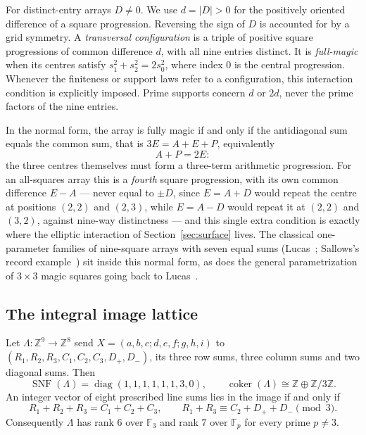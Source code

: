 For distinct-entry arrays $D\ne0$. We use $d=|D|>0$ for the positively
oriented difference of a square progression. Reversing the sign of $D$
is accounted for by a grid symmetry. A \emph{transversal configuration}
is a triple of positive square progressions of common difference $d$,
with all nine entries distinct. It is \emph{full-magic} when its centres
satisfy $s_1^2+s_2^2=2s_0^2$, where index $0$ is the central progression.
Whenever the finiteness or support laws refer to a configuration, this
interaction condition is explicitly imposed. Prime supports concern
$d$ or $2d$, never the prime factors of the nine entries.


\begin{remark}\label{rem:fourthAP}
In the normal form, the array is fully magic if and only if the
antidiagonal sum equals the common sum, that is $3E=A+E+P$, equivalently
\[
A+P=2E:
\]
the three centres themselves must form a three-term arithmetic progression.
For an all-squares array this is a \emph{fourth} square progression, with
its own common difference $E-A$ --- never equal to $\pm D$, since $E=A+D$
would repeat the centre at positions $(2,2)$ and $(2,3)$, while $E=A-D$
would repeat it at $(2,2)$ and $(3,2)$, against nine-way distinctness ---
and this single extra condition is exactly
where the elliptic interaction of Section~\ref{sec:surface} lives. The classical
one-parameter families of nine-square arrays with seven equal sums
(Lucas~\cite{LUC76}; Sallows's record example~\cite{SAL97}) sit inside this
normal form, as does the general parametrization of $3\times3$ magic
squares going back to Lucas~\cite{LUC91}.
\end{remark}


\subsection{The integral image lattice}

\begin{proposition}\label{prop:linesumsnf}
Let $\Lambda:\mathbb Z^9\to\mathbb Z^8$ send
$X=(a,b,c;d,e,f;g,h,i)$ to
$(R_1,R_2,R_3,C_1,C_2,C_3,D_+,D_-)$, its three row sums, three column sums
and two diagonal sums. Then
\[
\operatorname{SNF}(\Lambda)=\operatorname{diag}(1,1,1,1,1,1,3,0),
\qquad
\operatorname{coker}(\Lambda)\cong\mathbb Z\oplus\mathbb Z/3\mathbb Z.
\]
An integer vector of eight prescribed line sums lies in the image if and
only if
\[
R_1+R_2+R_3=C_1+C_2+C_3,
\qquad
R_1+R_3\equiv C_2+D_++D_-\pmod3.
\]
Consequently $\Lambda$ has rank $6$ over $\mathbb F_3$ and rank $7$ over
$\mathbb F_p$ for every prime $p\ne3$.
\end{proposition}


